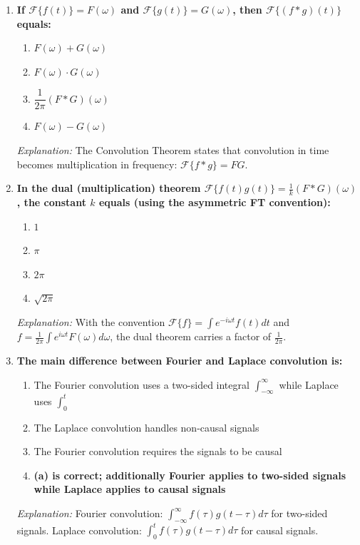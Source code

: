 \documentclass[12pt,a4paper]{article}
\begin{document}
\begin{enumerate}[label=\textbf{MCQ \arabic*.}, leftmargin=*, itemsep=12pt]

\item \textbf{If $\mathcal{F}\{f(t)\}=F(\omega)$ and $\mathcal{F}\{g(t)\}=G(\omega)$,
  then $\mathcal{F}\{(f*g)(t)\}$ equals:}
  \begin{enumerate}[label=(\alph*)]
    \item $F(\omega)+G(\omega)$
    \item \textbf{$F(\omega)\cdot G(\omega)$}
    \item $\dfrac{1}{2\pi}(F*G)(\omega)$
    \item $F(\omega)-G(\omega)$
  \end{enumerate}
  \textit{Explanation:} The Convolution Theorem states that convolution in time
  becomes multiplication in frequency: $\mathcal{F}\{f*g\} = FG$.

\item \textbf{In the dual (multiplication) theorem $\mathcal{F}\{f(t)g(t)\}=\frac{1}{k}
  (F*G)(\omega)$, the constant $k$ equals (using the asymmetric FT convention):}
  \begin{enumerate}[label=(\alph*)]
    \item $1$
    \item $\pi$
    \item \textbf{$2\pi$}
    \item $\sqrt{2\pi}$
  \end{enumerate}
  \textit{Explanation:} With the convention $\mathcal{F}\{f\}=\int e^{-i\omega t}f(t)dt$
  and $f=\frac{1}{2\pi}\int e^{i\omega t}F(\omega)d\omega$, the dual theorem
  carries a factor of $\frac{1}{2\pi}$.

\item \textbf{The main difference between Fourier and Laplace convolution is:}
  \begin{enumerate}[label=(\alph*)]
    \item The Fourier convolution uses a two-sided integral $\int_{-\infty}^{\infty}$
          while Laplace uses $\int_0^t$
    \item The Laplace convolution handles non-causal signals
    \item The Fourier convolution requires the signals to be causal
    \item \textbf{(a) is correct; additionally Fourier applies to two-sided signals
          while Laplace applies to causal signals}
  \end{enumerate}
  \textit{Explanation:} Fourier convolution: $\int_{-\infty}^{\infty}f(\tau)g(t-\tau)d\tau$
  for two-sided signals. Laplace convolution: $\int_0^t f(\tau)g(t-\tau)d\tau$ for
  causal signals.


\end{enumerate}
\end{document}
